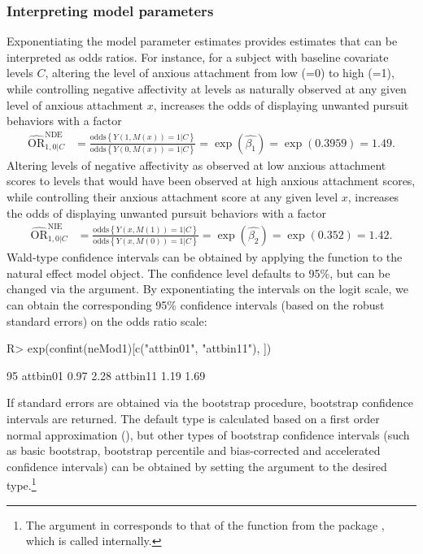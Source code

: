 \documentclass[nojss]{jss}
\begin{document}
\subsubsection{Interpreting model parameters}
Exponentiating the model parameter estimates provides estimates that can be interpreted as odds ratios. For instance, for a subject with baseline covariate levels $C$, altering the level of anxious attachment from low (=0) to high (=1), while controlling negative affectivity at levels as naturally observed at any given level of anxious attachment $x$, increases the odds of displaying unwanted pursuit behaviors with a factor
\begin{align*}
\widehat{\mbox{OR}}^{\text{NDE}}_{1,0|C} &= \frac{\mbox{odds}\left\{Y(1,M(x))=1|C\right\}}{\mbox{odds}\left\{Y(0,M(x))=1|C\right\}} = \exp(\hat{\beta_1}) = \exp(0.3959) = 1.49.
\end{align*}
Altering levels of negative affectivity as observed at low anxious attachment scores to levels that would have been observed at high anxious attachment scores, while controlling their anxious attachment score at any given level $x$, increases the odds of displaying unwanted pursuit behaviors with a factor
\begin{align*}
\widehat{\mbox{OR}}^{\text{NIE}}_{1,0|C} &= \frac{\mbox{odds}\left\{Y(x,M(1))=1|C\right\}}{\mbox{odds}\left\{Y(x,M(0))=1|C\right\}} = \exp(\hat{\beta_2}) = \exp(0.352) = 1.42.
\end{align*}
Wald-type confidence intervals can be obtained by applying the  function to the natural effect model object. The confidence level defaults to 95\%, but can be changed via the  argument. By exponentiating the intervals on the logit scale, we can obtain the corresponding 95\% confidence intervals (based on the robust standard errors) on the odds ratio scale:
\begin{Schunk}
\begin{Sinput}
R> exp(confint(neMod1)[c("attbin01", "attbin11"), ])
\end{Sinput}
\begin{Soutput}
         95%
attbin01    0.97    2.28
attbin11    1.19    1.69
\end{Soutput}
\end{Schunk}
If standard errors are obtained via the bootstrap procedure, bootstrap confidence intervals are returned. The default type is calculated based on a first order normal approximation (), but other types of bootstrap confidence intervals (such as basic bootstrap, bootstrap percentile and bias-corrected and accelerated confidence intervals) can be obtained by setting the  argument to the desired type.\footnote{The  argument in  corresponds to that of the  function from the  package \citep{R:boot}, which is called internally.}
\end{document}
